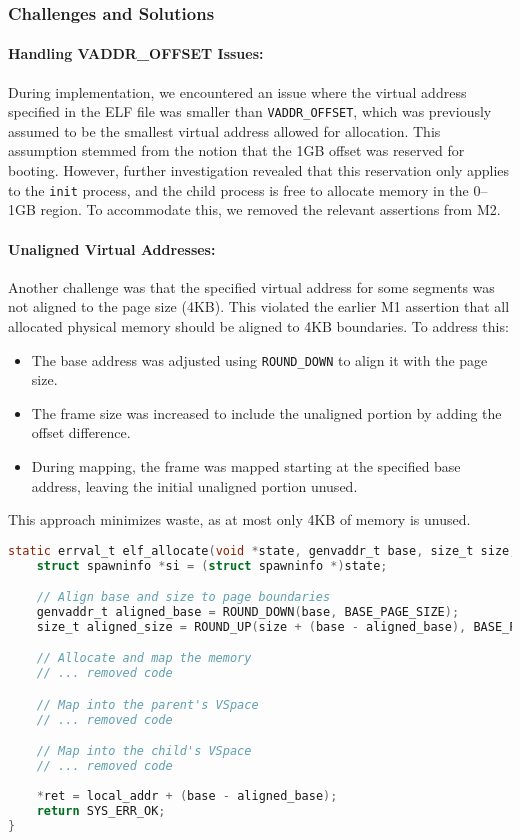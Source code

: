 \subsubsection*{Challenges and Solutions}
\paragraph{Handling VADDR\_OFFSET Issues:} During implementation, we encountered an issue where the virtual address specified in the ELF file was smaller than \texttt{VADDR\_OFFSET}, which was previously assumed to be the smallest virtual address allowed for allocation. This assumption stemmed from the notion that the 1GB offset was reserved for booting. However, further investigation revealed that this reservation only applies to the \texttt{init} process, and the child process is free to allocate memory in the 0–1GB region. To accommodate this, we removed the relevant assertions from M2.

\paragraph{Unaligned Virtual Addresses:} Another challenge was that the specified virtual address for some segments was not aligned to the page size (4KB). This violated the earlier M1 assertion that all allocated physical memory should be aligned to 4KB boundaries. To address this:
\begin{itemize}
    \item The base address was adjusted using \texttt{ROUND\_DOWN} to align it with the page size.
    \item The frame size was increased to include the unaligned portion by adding the offset difference.
    \item During mapping, the frame was mapped starting at the specified base address, leaving the initial unaligned portion unused.
\end{itemize}
This approach minimizes waste, as at most only 4KB of memory is unused.

\begin{lstlisting}[caption={Mapping ELF segments with alignment considerations}, label=lst:elf_mapping, language=C]
static errval_t elf_allocate(void *state, genvaddr_t base, size_t size, uint32_t flags, void **ret) {
    struct spawninfo *si = (struct spawninfo *)state;

    // Align base and size to page boundaries
    genvaddr_t aligned_base = ROUND_DOWN(base, BASE_PAGE_SIZE);
    size_t aligned_size = ROUND_UP(size + (base - aligned_base), BASE_PAGE_SIZE);

    // Allocate and map the memory
    // ... removed code

    // Map into the parent's VSpace
    // ... removed code

    // Map into the child's VSpace
    // ... removed code
    
    *ret = local_addr + (base - aligned_base);
    return SYS_ERR_OK;
}
\end{lstlisting}

